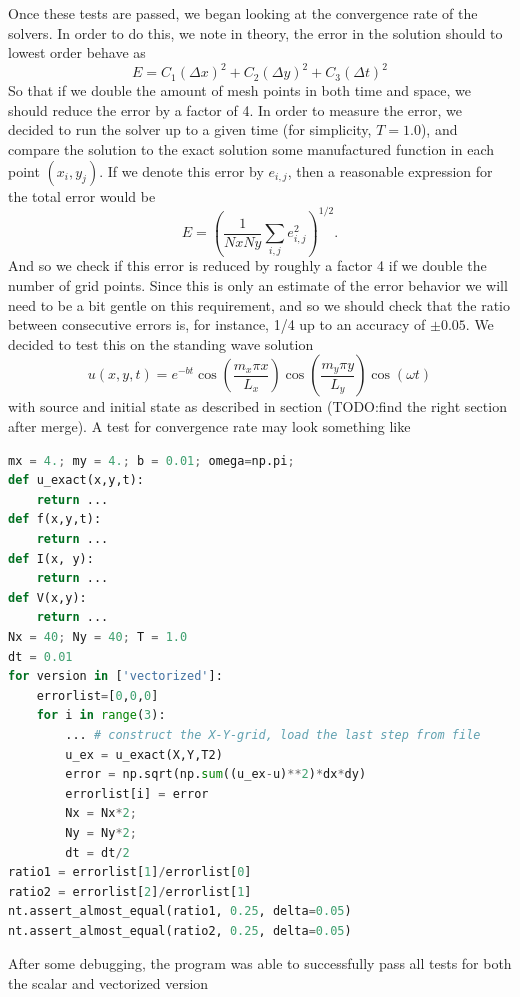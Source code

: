 \documentclass[12pt]{article}
\begin{document}
Once these tests are passed, we began looking at the convergence rate of the solvers. In order to do this, we note in theory, the error in the solution should to lowest order behave as 
\begin{equation}\label{eq:errororder}
 E = C_1 (\Delta x)^2 + C_2(\Delta y)^2 + C_3(\Delta t)^2
\end{equation}
So that if we double the amount of mesh points in both time and space, we should reduce the error by a factor of 4. In order to measure the error, we decided to run the solver up to a given time (for simplicity, $T = 1.0$), and compare the solution to the exact solution some manufactured function in each point $(x_i,y_j)$. If we denote this error by $e_{i,j}$, then a reasonable expression for the total error would be 
\begin{equation}\label{eq:errorestimate}
 E = \left( \frac{1}{NxNy}\sum_{i,j} e_{i,j}^2 \right)^{1/2}.
\end{equation}
And so we check if this error is reduced by roughly a factor 4 if we double the number of grid points. Since this is only an estimate of the error behavior we will need to be a bit gentle on this requirement, and so we should check that the ratio between consecutive errors is, for instance, 1/4 up to an accuracy of $\pm 0.05$. We decided to test this on the standing wave solution 
\begin{equation}
 u(x,y,t) = e^{-bt}\cos\left(\frac{m_x \pi x }{L_x}\right)\cos\left(\frac{m_y \pi y }{L_y}\right)\cos(\omega t)
\end{equation}
with source and initial state as described in section (TODO:find the right section after merge). A test for convergence rate may look something like
\begin{lstlisting}[language=Python]
mx = 4.; my = 4.; b = 0.01; omega=np.pi;
def u_exact(x,y,t):
	return ...
def f(x,y,t):
	return ...
def I(x, y):
	return ...
def V(x,y):
	return ...
Nx = 40; Ny = 40; T = 1.0
dt = 0.01
for version in ['vectorized']:
	errorlist=[0,0,0]
	for i in range(3):	
		... # construct the X-Y-grid, load the last step from file
		u_ex = u_exact(X,Y,T2)
		error = np.sqrt(np.sum((u_ex-u)**2)*dx*dy)
		errorlist[i] = error
		Nx = Nx*2;
		Ny = Ny*2;
		dt = dt/2
ratio1 = errorlist[1]/errorlist[0]
ratio2 = errorlist[2]/errorlist[1]
nt.assert_almost_equal(ratio1, 0.25, delta=0.05)
nt.assert_almost_equal(ratio2, 0.25, delta=0.05)
\end{lstlisting}

After some debugging, the program was able to successfully pass all tests for both the scalar and vectorized version
\end{document}
